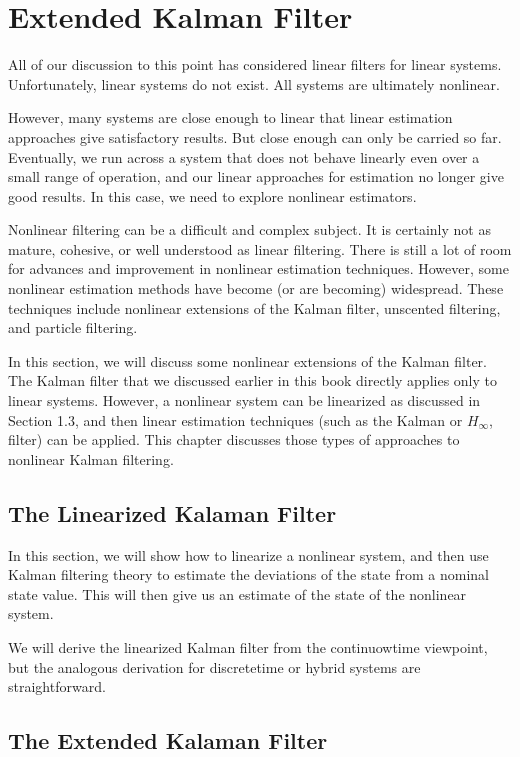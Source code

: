 \section{Extended Kalman Filter}
\label{extended_kalman_filter}

All of  our discussion to this point has considered linear filters for linear systems.
Unfortunately, linear systems do not  exist.  All systems are ultimately nonlinear.

However, many systems are  close enough to linear that linear estimation approaches give satisfactory results. 
But  close enough can only be carried so far.  Eventually, we run across a system 
that does not behave linearly even over a small range of  operation, and our linear 
approaches for  estimation  no longer give good results.  In this case, we  need  to  explore nonlinear estimators. 

Nonlinear filtering can be a difficult and complex subject.  It is certainly not as 
mature, cohesive, or well understood  as linear filtering. There is still a lot of  room 
for advances and improvement in nonlinear estimation techniques.  However, some 
nonlinear  estimation methods have become  (or are becoming) widespread.  These 
techniques  include nonlinear  extensions of  the Kalman filter,  unscented  filtering, 
and particle filtering.

In this section, we will discuss some nonlinear extensions of  the Kalman filter. 
The Kalman filter  that we  discussed earlier  in this book  directly  applies only to 
linear  systems.  However,  a  nonlinear  system  can  be  linearized  as discussed  in 
Section  1.3, and then  linear  estimation  techniques  (such  as the  Kalman  or  $H_{\infty}$, 
filter) can be applied.  This chapter discusses those types of approaches to nonlinear 
Kalman filtering.



\subsection{The Linearized Kalaman Filter }
In  this section, we  will show how  to linearize a nonlinear system, and  then  use 
Kalman  filtering theory to estimate the  deviations  of  the state  from a  nominal 
state value. This will then give us an estimate of the state of the nonlinear system.

We will derive the linearized Kalman filter from the continuowtime viewpoint, but 
the analogous derivation for discretetime or hybrid systems are straightforward.

\subsection{The Extended Kalaman Filter }

